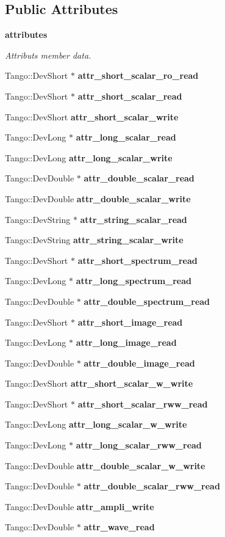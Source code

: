 \subsection*{Public Attributes}
\begin{Indent}{\bf attributes}\par
{\em Attributs member data.}\begin{CompactItemize}
\item 
Tango::Dev\-Short $\ast$ {\bf attr\_\-short\_\-scalar\_\-ro\_\-read}
\item 
Tango::Dev\-Short $\ast$ {\bf attr\_\-short\_\-scalar\_\-read}
\item 
Tango::Dev\-Short {\bf attr\_\-short\_\-scalar\_\-write}
\item 
Tango::Dev\-Long $\ast$ {\bf attr\_\-long\_\-scalar\_\-read}
\item 
Tango::Dev\-Long {\bf attr\_\-long\_\-scalar\_\-write}
\item 
Tango::Dev\-Double $\ast$ {\bf attr\_\-double\_\-scalar\_\-read}
\item 
Tango::Dev\-Double {\bf attr\_\-double\_\-scalar\_\-write}
\item 
Tango::Dev\-String $\ast$ {\bf attr\_\-string\_\-scalar\_\-read}
\item 
Tango::Dev\-String {\bf attr\_\-string\_\-scalar\_\-write}
\item 
Tango::Dev\-Short $\ast$ {\bf attr\_\-short\_\-spectrum\_\-read}
\item 
Tango::Dev\-Long $\ast$ {\bf attr\_\-long\_\-spectrum\_\-read}
\item 
Tango::Dev\-Double $\ast$ {\bf attr\_\-double\_\-spectrum\_\-read}
\item 
Tango::Dev\-Short $\ast$ {\bf attr\_\-short\_\-image\_\-read}
\item 
Tango::Dev\-Long $\ast$ {\bf attr\_\-long\_\-image\_\-read}
\item 
Tango::Dev\-Double $\ast$ {\bf attr\_\-double\_\-image\_\-read}
\item 
Tango::Dev\-Short {\bf attr\_\-short\_\-scalar\_\-w\_\-write}
\item 
Tango::Dev\-Short $\ast$ {\bf attr\_\-short\_\-scalar\_\-rww\_\-read}
\item 
Tango::Dev\-Long {\bf attr\_\-long\_\-scalar\_\-w\_\-write}
\item 
Tango::Dev\-Long $\ast$ {\bf attr\_\-long\_\-scalar\_\-rww\_\-read}
\item 
Tango::Dev\-Double {\bf attr\_\-double\_\-scalar\_\-w\_\-write}
\item 
Tango::Dev\-Double $\ast$ {\bf attr\_\-double\_\-scalar\_\-rww\_\-read}
\item 
Tango::Dev\-Double {\bf attr\_\-ampli\_\-write}
\item 
Tango::Dev\-Double $\ast$ {\bf attr\_\-wave\_\-read}
\end{CompactItemize}
\end{Indent}
